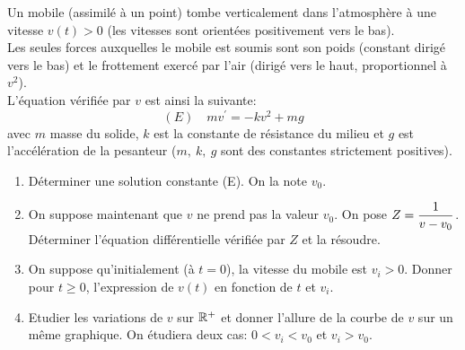 \documentclass[a4paper, 11pt,reqno]{article}
\begin{document}
\begin{exercice}  \;
Un mobile (assimil\'e \`a un point) tombe verticalement dans l'atmosph\`ere \`a une vitesse $v(t)>0$ (les vitesses sont orient\'ees positivement vers le bas). \\
\noindent Les seules forces auxquelles le mobile est soumis sont son poids (constant dirig\'e vers le bas) et le frottement exerc\'e par l'air (dirig\'e vers le haut, proportionnel \`a $v^2$).\\
\noindent L'\'equation v\'erifi\'ee par $v$ est ainsi la suivante:
$$(E)\quad mv^{\prime}=-kv^2+mg$$
avec $m$ masse du solide, $k$ est la constante de r\'esistance du milieu et $g$ est l'acc\'el\'eration de la pesanteur ($m,\ k,\ g$ sont des constantes strictement positives).
\begin{enumerate}
\item D\'eterminer une solution constante (E). On la note $v_0$.
\item On suppose maintenant que $v$ ne prend pas la valeur $v_0$. On pose $Z=\displaystyle\frac{1}{v-v_0}$. D\'eterminer l'\'equation diff\'erentielle v\'erifi\'ee par $Z$ et la r\'esoudre.
\item On suppose qu'initialement (\`a $t=0$), la vitesse du mobile est $v_i>0$. Donner pour $t\geq 0$, l'expression de $v(t)$ en fonction de $t$ et $v_i$.
\item Etudier les variations de $v$ sur $\mathbb{R}^+$ et donner l'allure de la courbe de $v$ sur un m\^eme graphique. On \'etudiera deux cas: $0<v_i<v_0$ et $v_i>v_0$.
\end{enumerate}
\end{exercice}
\end{document}

